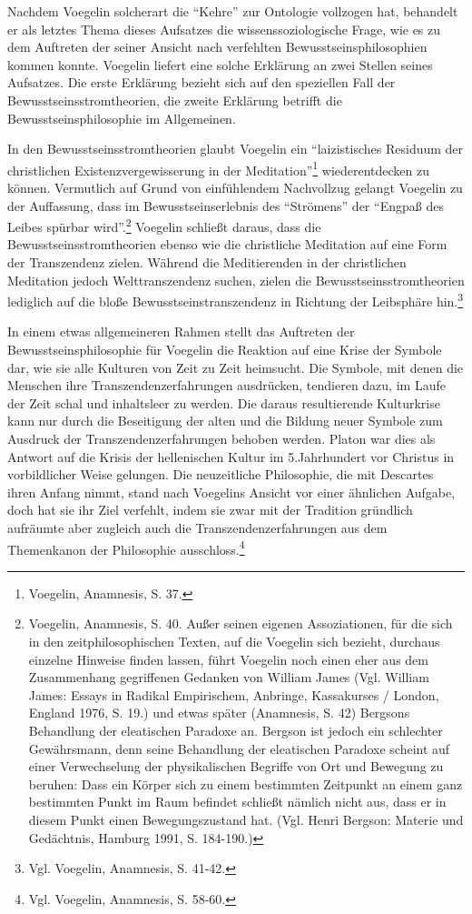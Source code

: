 Nachdem Voegelin solcherart die "`Kehre"' zur Ontologie vollzogen hat,
behandelt er als letztes Thema dieses Aufsatzes die wissenssoziologische
Frage, wie es zu dem Auftreten der seiner Ansicht nach verfehlten
Bewusstseinsphilosophien kommen konnte. Voegelin liefert eine solche Erklärung
an zwei Stellen seines Aufsatzes. Die erste Erklärung bezieht sich auf den
speziellen Fall der Bewusstseinsstromtheorien, die zweite Erklärung betrifft
die Bewusstseinsphilosophie im Allgemeinen.

In den Bewusstseinsstromtheorien glaubt Voegelin ein "`laizistisches Residuum
der christlichen Existenzvergewisserung in der Meditation"'\footnote{Voegelin,
  Anamnesis, S. 37.} wiederentdecken zu können. Vermutlich auf Grund von
einfühlendem Nachvollzug gelangt Voegelin zu der Auf\/fassung, dass im
Bewusstseinserlebnis des "`Strömens"' der "`Engpaß des Leibes spürbar
wird"'.\footnote{Voegelin, Anamnesis, S.  40. Außer seinen eigenen
  Assoziationen, für die sich in den zeitphilosophischen Texten, auf die
  Voegelin sich bezieht, durchaus einzelne Hinweise finden lassen, führt
  Voegelin noch einen eher aus dem Zusammenhang gegriffenen Gedanken von
  William James (Vgl. William James: Essays in Radikal Empirischem, Anbringe,
  Kassakurses / London, England 1976, S. 19.) und etwas später (Anamnesis,
  S. 42) Bergsons Behandlung der eleatischen Paradoxe an. Bergson ist jedoch
  ein schlechter Gewährsmann, denn seine Behandlung der eleatischen Paradoxe
  scheint auf einer Verwechselung der physikalischen Begriffe von Ort und
  Bewegung zu beruhen: Dass ein Körper sich zu einem bestimmten Zeitpunkt an
  einem ganz bestimmten Punkt im Raum befindet schließt nämlich nicht aus,
  dass er in diesem Punkt einen Bewegungszustand hat.  (Vgl. Henri Bergson:
  Materie und Gedächtnis, Hamburg 1991, S. 184-190.)}  Voegelin schließt
daraus, dass die Bewusstseinsstromtheorien ebenso wie die christliche
Meditation auf eine Form der Transzendenz zielen.  Während die Meditierenden
in der christlichen Meditation jedoch Welttranszendenz suchen, zielen die
Bewusstseinsstromtheorien lediglich auf die bloße Bewusstseinstranszendenz in
Richtung der Leibsphäre hin.\footnote{Vgl. Voegelin, Anamnesis, S. 41-42.}

In einem etwas allgemeineren Rahmen stellt das Auftreten der
Bewusstseinsphilosophie für Voegelin die Reaktion auf eine Krise der Symbole
dar, wie sie alle Kulturen von Zeit zu Zeit heimsucht. Die Symbole, mit denen
die Menschen ihre Transzendenzerfahrungen ausdrücken, tendieren dazu, im Laufe
der Zeit schal und inhaltsleer zu werden. Die daraus resultierende Kulturkrise
kann nur durch die Beseitigung der alten und die Bildung neuer Symbole zum
Ausdruck der Transzendenzerfahrungen behoben werden. Platon war dies als
Antwort auf die Krisis der hellenischen Kultur im 5.Jahrhundert vor Christus
in vorbildlicher Weise gelungen. Die neuzeitliche Philosophie, die mit
Descartes ihren Anfang nimmt, stand nach Voegelins Ansicht vor einer ähnlichen
Aufgabe, doch hat sie ihr Ziel verfehlt, indem sie zwar mit der Tradition
gründlich aufräumte aber zugleich auch die Transzendenzerfahrungen aus dem
Themenkanon der Philosophie ausschloss.\footnote{Vgl. Voegelin, Anamnesis,
  S. 58-60.}

